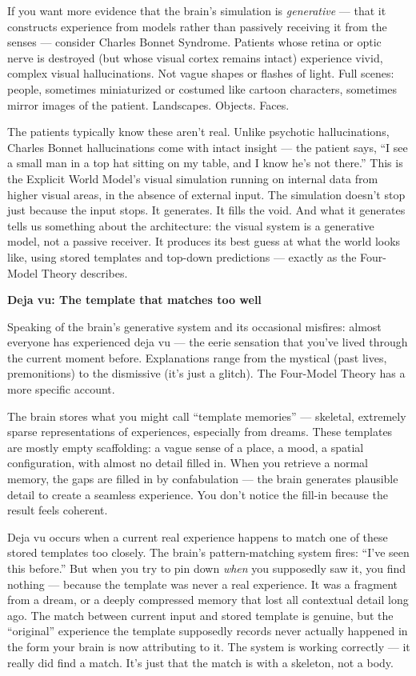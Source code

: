\documentclass[11pt, twoside, openright]{book}
\begin{document}
If you want more evidence that the brain's simulation is \textit{generative} --- that it constructs experience from models rather than passively receiving it from the senses --- consider Charles Bonnet Syndrome. Patients whose retina or optic nerve is destroyed (but whose visual cortex remains intact) experience vivid, complex visual hallucinations. Not vague shapes or flashes of light. Full scenes: people, sometimes miniaturized or costumed like cartoon characters, sometimes mirror images of the patient. Landscapes. Objects. Faces.

The patients typically know these aren't real. Unlike psychotic hallucinations, Charles Bonnet hallucinations come with intact insight --- the patient says, ``I see a small man in a top hat sitting on my table, and I know he's not there.'' This is the Explicit World Model's visual simulation running on internal data from higher visual areas, in the absence of external input. The simulation doesn't stop just because the input stops. It generates. It fills the void. And what it generates tells us something about the architecture: the visual system is a generative model, not a passive receiver. It produces its best guess at what the world looks like, using stored templates and top-down predictions --- exactly as the Four-Model Theory describes.

\textbf{Deja vu: The template that matches too well}

Speaking of the brain's generative system and its occasional misfires: almost everyone has experienced deja vu --- the eerie sensation that you've lived through the current moment before. Explanations range from the mystical (past lives, premonitions) to the dismissive (it's just a glitch). The Four-Model Theory has a more specific account.

The brain stores what you might call ``template memories'' --- skeletal, extremely sparse representations of experiences, especially from dreams. These templates are mostly empty scaffolding: a vague sense of a place, a mood, a spatial configuration, with almost no detail filled in. When you retrieve a normal memory, the gaps are filled in by confabulation --- the brain generates plausible detail to create a seamless experience. You don't notice the fill-in because the result feels coherent.

Deja vu occurs when a current real experience happens to match one of these stored templates too closely. The brain's pattern-matching system fires: ``I've seen this before.'' But when you try to pin down \textit{when} you supposedly saw it, you find nothing --- because the template was never a real experience. It was a fragment from a dream, or a deeply compressed memory that lost all contextual detail long ago. The match between current input and stored template is genuine, but the ``original'' experience the template supposedly records never actually happened in the form your brain is now attributing to it. The system is working correctly --- it really did find a match. It's just that the match is with a skeleton, not a body.
\end{document}
